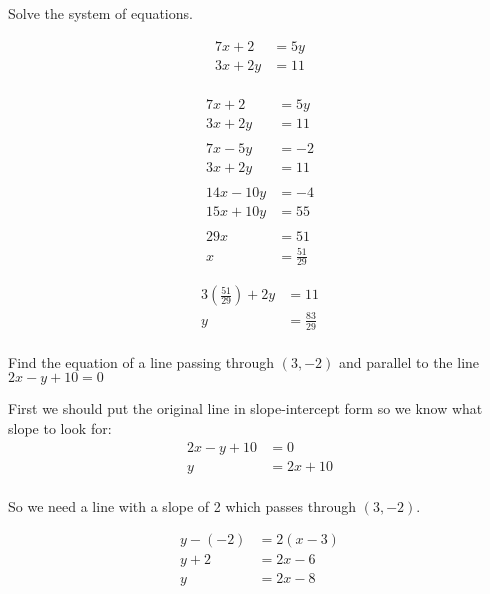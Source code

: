\documentclass[fleqn,addpoints]{exam}
\begin{document}
\begin{questions}
\question
Solve the system of equations.

\begin{align*}
  7x + 2  &= 5y \\
  3x + 2y &= 11 \\
\end{align*}

\begin{solution}[1cm]
\begin{align*}
  7x + 2  &= 5y \\
  3x + 2y &= 11 \\
  \\
  7x - 5y &= -2 \\
  3x + 2y &= 11 \\
  \\
  14x - 10y &= -4 \\
  15x + 10y &= 55 \\
  \\
  29x &= 51
  \\
  x &= \frac{51}{29}
\end{align*}

\begin{align*}
  3 \left( \frac{51}{29} \right) + 2y &= 11 \\
  y &= \frac{83}{29} \\
\end{align*}

\end{solution}

\question
Find the equation of a line passing through $(3, -2)$ and parallel to the line $2x-y+10 = 0$

\begin{solution}[1cm]
First we should put the original line in slope-intercept form so we know what slope to look for:
\begin{align*}
  2x-y+10 &= 0 \\
  y &= 2x + 10 \\
\end{align*}

So we need a line with a slope of 2 which passes through $(3, -2)$.

\begin{align*}
  y - (-2) &= 2(x - 3) \\
  y +2 &= 2x- 6 \\
  y &= 2x - 8 \\
\end{align*}

\end{solution}


\end{questions}
\end{document}
